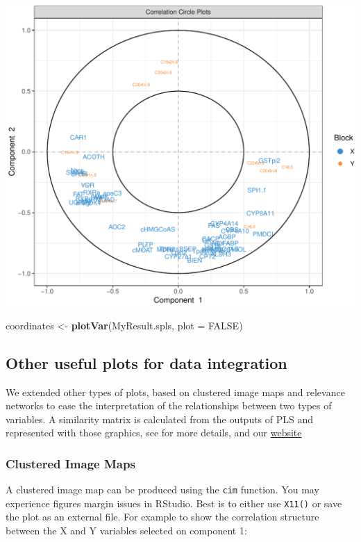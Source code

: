 \documentclass[]{book}
\newenvironment{Shaded}{\begin{snugshade}}{\end{snugshade}}
\newcommand{\DataTypeTok}[1]{\textcolor[rgb]{0.13,0.29,0.53}{#1}}
\newcommand{\KeywordTok}[1]{\textcolor[rgb]{0.13,0.29,0.53}{\textbf{#1}}}
\newcommand{\NormalTok}[1]{#1}
\newcommand{\OtherTok}[1]{\textcolor[rgb]{0.56,0.35,0.01}{#1}}
\newcommand{\StringTok}[1]{\textcolor[rgb]{0.31,0.60,0.02}{#1}}
\begin{document}
\begin{center}\includegraphics[width=0.5\linewidth,]{Figures/05-pls-plotVar-1-1} \end{center}

\begin{Shaded}
\begin{Highlighting}[]
\NormalTok{coordinates <-}\StringTok{ }\KeywordTok{plotVar}\NormalTok{(MyResult.spls, }\DataTypeTok{plot =} \OtherTok{FALSE}\NormalTok{)}
\end{Highlighting}
\end{Shaded}

\hypertarget{other-useful-plots-for-data-integration}{%
\subsection{Other useful plots for data integration}\label{other-useful-plots-for-data-integration}}

We extended other types of plots, based on clustered image maps and relevance networks to ease the interpretation of the relationships between two types of variables. A similarity matrix is calculated from the outputs of PLS and represented with those graphics, see \citep{Gon12} for more details, and our \href{http://mixomics.org/graphics/variable-plots/}{website}

\hypertarget{clustered-image-maps}{%
\subsubsection{Clustered Image Maps}\label{clustered-image-maps}}

A clustered image map can be produced using the \texttt{cim} function. You may experience figures margin issues in RStudio. Best is to either use \texttt{X11()} or save the plot as an external file. For example to show the correlation structure between the X and Y variables selected on component 1:
\end{document}

